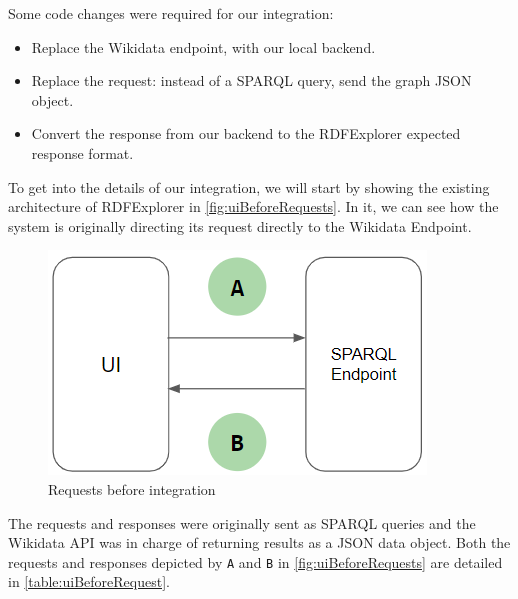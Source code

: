 Some code changes were required for our integration: 
\begin{itemize}
    \item Replace the Wikidata endpoint, with our local backend.
    \item Replace the request: instead of a SPARQL query, send the graph JSON object.
    \item Convert the response from our backend to the RDFExplorer expected response format.
\end{itemize} 

To get into the details of our integration, we will start by showing the existing architecture of RDFExplorer in \autoref{fig:uiBeforeRequests}. In it, we can see how the system is originally directing its request directly to the Wikidata Endpoint. 

\begin{figure}[h]
    \centering
        \includegraphics[width=0.4\linewidth]{imagenes/uiBeforeRequest.png}
        \caption{Requests before integration}
        \label{fig:uiBeforeRequests}
\end{figure}

The requests and responses were originally sent as SPARQL queries and the Wikidata API was in charge of returning results as a JSON data object. Both the requests and responses depicted by \texttt{A} and \texttt{B} in \autoref{fig:uiBeforeRequests} are detailed in \autoref{table:uiBeforeRequest}.

